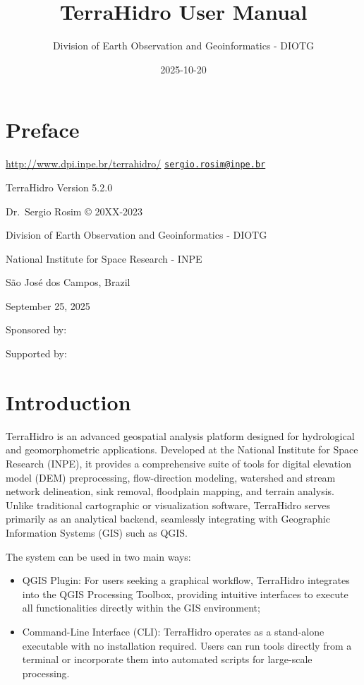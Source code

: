 \documentclass[
]{book}
\title{TerraHidro User Manual}
\author{Division of Earth Observation and Geoinformatics - DIOTG}
\date{2025-10-20}
\begin{document}
\maketitle

{
\setcounter{tocdepth}{1}
\tableofcontents
}
\chapter{Preface}\label{preface}

\url{http://www.dpi.inpe.br/terrahidro/} \textbar{} \href{mailto:sergio.rosim@inpe.br}{\nolinkurl{sergio.rosim@inpe.br}}

TerraHidro Version 5.2.0

Dr.~Sergio Rosim © 20XX-2023

Division of Earth Observation and Geoinformatics - DIOTG

National Institute for Space Research - INPE

São José dos Campos, Brazil

September 25, 2025

Sponsored by:

Supported by:

\chapter{Introduction}\label{introduction}

TerraHidro is an advanced geospatial analysis platform designed for hydrological and geomorphometric applications. Developed at the National Institute for Space Research (INPE), it provides a comprehensive suite of tools for digital elevation model (DEM) preprocessing, flow-direction modeling, watershed and stream network delineation, sink removal, floodplain mapping, and terrain analysis. Unlike traditional cartographic or visualization software, TerraHidro serves primarily as an analytical backend, seamlessly integrating with Geographic Information Systems (GIS) such as QGIS.

The system can be used in two main ways:

\begin{itemize}
\item
  QGIS Plugin: For users seeking a graphical workflow, TerraHidro integrates into the QGIS Processing Toolbox, providing intuitive interfaces to execute all functionalities directly within the GIS environment;
\item
  Command-Line Interface (CLI): TerraHidro operates as a stand-alone executable with no installation required. Users can run tools directly from a terminal or incorporate them into automated scripts for large-scale processing.
\end{itemize}
\end{document}
